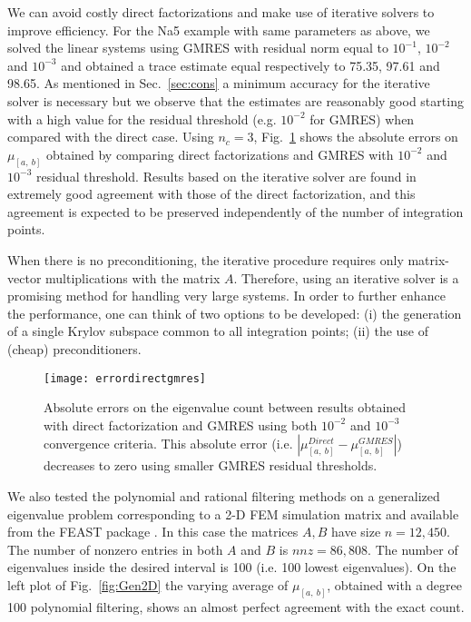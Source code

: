 \documentclass[12pt]{article}		\usepackage{tabls,multirow}
\newcommand{\ab}{[a, \ b]}
\begin{document}
We can avoid costly direct factorizations and make use of iterative
solvers to improve efficiency. For the Na5 example with same
parameters as above, we solved the linear systems using GMRES with
residual norm equal to $10^{-1}$, $10^{-2}$ and $10^{-3}$ and obtained
a trace estimate equal respectively to 75.35, 97.61 and 98.65.  As
mentioned in Sec.~\ref{sec:cons} a minimum accuracy for the iterative
solver is necessary but we observe that the estimates are reasonably
good starting with a high value for the residual threshold
(e.g. $10^{-2}$ for GMRES) when compared with the direct case. Using
$n_c=3$, Fig.~\ref{fig:errordirectgmres} shows the absolute errors on
$\mu_{\ab}$ obtained by comparing direct factorizations and GMRES with
$10^{-2}$ and $10^{-3}$ residual threshold. Results based on the
iterative solver are found in extremely good agreement with those of
the direct factorization, and this agreement is expected to be
preserved independently of the number of integration points.

When there is no preconditioning, the iterative procedure requires
only matrix-vector multiplications with the matrix $A$. Therefore,
using an iterative solver is a promising method for handling very
large systems. In order to further enhance the performance, one can
think of two options to be developed: (i) the generation of a single
Krylov subspace common to all integration points; (ii) the use of
(cheap) preconditioners.

\begin{figure}[hbt]
\centerline{ 
\texttt{[image: errordirectgmres]}} 
\caption{Absolute 
errors on the eigenvalue count between results obtained with direct factorization and 
GMRES using both $10^{-2}$ and $10^{-3}$ convergence criteria. 
This absolute error (i.e. $|\mu_{\ab}^{Direct}-\mu_{\ab}^{GMRES}|$) decreases to zero
using smaller GMRES residual thresholds.
\label{fig:errordirectgmres}}
\end{figure}

We also tested the polynomial and rational filtering methods on a
generalized eigenvalue problem corresponding to a 2-D FEM simulation
matrix and available from the FEAST package \cite{FEASTsolver}.  In
this case the matrices $A, B$ have size $n = 12,450$. The number of
nonzero entries in both $A$ and $B$ is $nnz = 86,808$.  The number of
eigenvalues inside the desired interval is 100 (i.e. 100 lowest
eigenvalues).  On the left plot of Fig.~\ref{fig:Gen2D} the varying
average of $\mu_{\ab}$, obtained with a degree 100 polynomial
filtering, shows an almost perfect agreement with the exact count.
\end{document}
